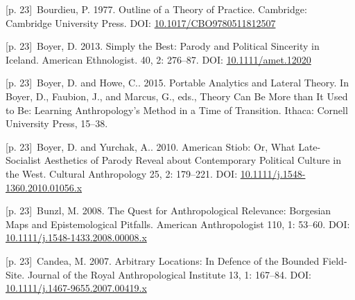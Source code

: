 \documentclass[10pt,a4paper]{article}
\begin{document}
\noindent\begin{minipage}[t]{\linewidth}{\scriptsize\color{gray} [p. 23]}\ Bourdieu, P. 1977. Outline of a Theory of Practice. Cambridge: Cambridge University Press. DOI: \url{10.1017/CBO9780511812507}\par\end{minipage}\par
\noindent\begin{minipage}[t]{\linewidth}{\scriptsize\color{gray} [p. 23]}\ Boyer, D. 2013. Simply the Best: Parody and Political Sincerity in Iceland. American Ethnologist. 40, 2: 276–87. DOI: \url{10.1111/amet.12020}\par\end{minipage}\par
\noindent\begin{minipage}[t]{\linewidth}{\scriptsize\color{gray} [p. 23]}\ Boyer, D. and Howe, C.. 2015. Portable Analytics and Lateral Theory. In Boyer, D., Faubion, J., and Marcus, G., eds., Theory Can Be More than It Used to Be: Learning Anthropology’s Method in a Time of Transition. Ithaca: Cornell University Press, 15–38.\par\end{minipage}\par
\noindent\begin{minipage}[t]{\linewidth}{\scriptsize\color{gray} [p. 23]}\ Boyer, D. and Yurchak, A.. 2010. American Stiob: Or, What Late-Socialist Aesthetics of Parody Reveal about Contemporary Political Culture in the West. Cultural Anthropology 25, 2: 179–221. DOI: \url{10.1111/j.1548-1360.2010.01056.x}\par\end{minipage}\par
\noindent\begin{minipage}[t]{\linewidth}{\scriptsize\color{gray} [p. 23]}\ Bunzl, M. 2008. The Quest for Anthropological Relevance: Borgesian Maps and Epistemological Pitfalls. American Anthropologist 110, 1: 53–60. DOI: \url{10.1111/j.1548-1433.2008.00008.x}\par\end{minipage}\par
\noindent\begin{minipage}[t]{\linewidth}{\scriptsize\color{gray} [p. 23]}\ Candea, M. 2007. Arbitrary Locations: In Defence of the Bounded Field-Site. Journal of the Royal Anthropological Institute 13, 1: 167–84. DOI: \url{10.1111/j.1467-9655.2007.00419.x}\par\end{minipage}\par
\end{document}
